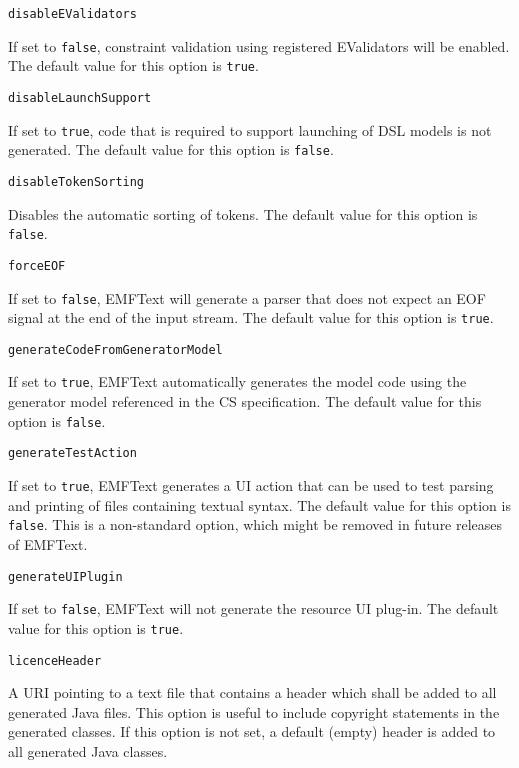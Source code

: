 \noindent\texttt{disableEValidators}
\begin{myindentpar}{1cm}
If set to \texttt{false}, constraint validation using registered EValidators will be enabled. The default value for this option is \texttt{true}.
\end{myindentpar}

\noindent\texttt{disableLaunchSupport}
\begin{myindentpar}{1cm}
If set to \texttt{true}, code that is required to support launching of DSL models is not generated. The default value for this option is \texttt{false}.
\end{myindentpar}

\noindent\texttt{disableTokenSorting}
\begin{myindentpar}{1cm}
Disables the automatic sorting of tokens. The default value for this option is \texttt{false}.
\end{myindentpar}

\noindent\texttt{forceEOF}
\begin{myindentpar}{1cm}
If set to \texttt{false}, EMFText will generate a parser that does not expect an EOF signal at the end of the input stream. The default value for this option is \texttt{true}.
\end{myindentpar}

\noindent\texttt{generateCodeFromGeneratorModel}
\begin{myindentpar}{1cm}
If set to \texttt{true}, EMFText automatically generates the model code using the generator model referenced in the CS specification. The default value for this option is \texttt{false}.
\end{myindentpar}

\noindent\texttt{generateTestAction}
\begin{myindentpar}{1cm}
If set to \texttt{true}, EMFText generates a UI action that can be used to test parsing and printing of files containing textual syntax. The default value for this option is \texttt{false}. This is a non-standard option, which might be removed in future releases of EMFText.
\end{myindentpar}

\noindent\texttt{generateUIPlugin}
\begin{myindentpar}{1cm}
If set to \texttt{false}, EMFText will not generate the resource UI plug-in. The default value for this option is \texttt{true}.
\end{myindentpar}

\noindent\texttt{licenceHeader}
\begin{myindentpar}{1cm}
A URI pointing to a text file that contains a header which shall be added to all generated Java files. This option is useful to include copyright statements in the generated classes. If this option is not set, a default (empty) header is added to all generated Java classes.
\end{myindentpar}

